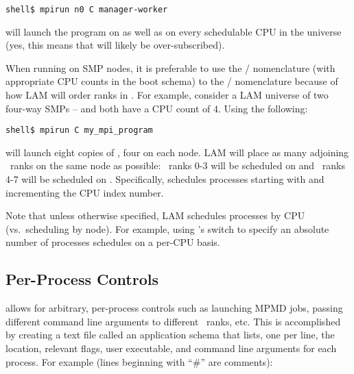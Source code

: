 \lstset{style=lam-cmdline}
\begin{lstlisting}
shell$ mpirun n0 C manager-worker
\end{lstlisting}

\noindent will launch the  program on 
as well as on every schedulable CPU in the universe (yes, this means
that  will likely be over-subscribed).

When running on SMP nodes, it is preferable to use the
/ nomenclature (with appropriate CPU
counts in the boot schema) to the /
nomenclature because of how LAM will order ranks in \mcw.  For
example, consider a LAM universe of two four-way SMPs -- 
and  both have a CPU count of 4.  Using the following:

\lstset{style=lam-cmdline}
\begin{lstlisting}
shell$ mpirun C my_mpi_program
\end{lstlisting}

\noindent will launch eight copies of , four
on each node.  LAM will place as many adjoining \mcw\ ranks on the
same node as possible: \mcw\ ranks 0-3 will be scheduled on
 and \mcw\ ranks 4-7 will be scheduled on .
Specifically,  schedules processes starting with 
and incrementing the CPU index number.

Note that unless otherwise specified, LAM schedules processes by CPU
(vs.\ scheduling by node).  For example, using 's
 switch to specify an absolute number of processes
schedules on a per-CPU basis.


\subsection{Per-Process Controls}

 allows for arbitrary, per-process controls such as
launching MPMD jobs, passing different command line arguments to
different \mcw\ ranks, etc.  This is accomplished by creating a text
file called an application schema that lists, one per line, the
location, relevant flags, user executable, and command line arguments
for each process.  For example (lines beginning with ``\#'' are
comments):

